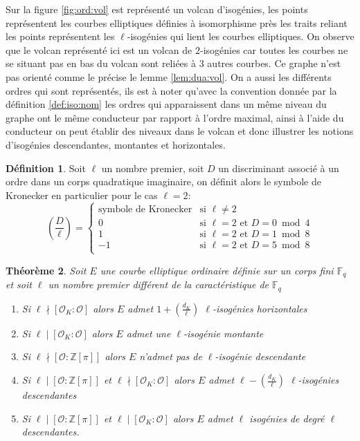 \documentclass[10pt,a4paper]{book}
\theoremstyle{plain}
\newtheorem{thm}{Théorème}[chapter]
\theoremstyle{definition}
\theoremstyle{definition}
\theoremstyle{definition}
\theoremstyle{definition}
\newtheorem{defi}[thm]{Définition}
\theoremstyle{remark}
\theoremstyle{remark}
\theoremstyle{definition}
\begin{document}
Sur la figure \ref{fig:ord:vol} est représenté un volcan d'isogénies, les points représentent les courbes elliptiques définies à isomorphisme près les traits reliant les points représentent les $\ell$-isogénies qui lient les courbes elliptiques. On observe que le volcan représenté ici est un volcan de $2$-isogénies car toutes les courbes ne se situant pas en bas du volcan sont reliées à $3$ autres courbes. Ce graphe n'est pas orienté comme le précise le lemme \ref{lem:dua:vol}. On a aussi les différents ordres qui sont représentés, ils est à noter qu'avec la convention donnée par la définition \ref{def:iso:nom} les ordres qui apparaissent dans un même niveau du graphe ont le même conducteur par rapport à l'ordre maximal, ainsi à l'aide du conducteur on peut établir des niveaux dans le volcan et donc illustrer les notions d'isogénies descendantes, montantes et horizontales. 

\begin{defi}
Soit $\ell$ un nombre premier, soit $D$ un discriminant associé à un ordre dans
un corps quadratique imaginaire, on définit alors le symbole de Kronecker en 
particulier pour le cas $\ell=2$:
\begin{equation*}
\left( \frac{D}{\ell} \right)= \begin{cases}
  \text{symbole de Kronecker} & \text{si } \ell\neq 2 \\
0 & \text{si } \ell=2 \text{ et } D=0 \bmod 4 \\
1 & \text{si } \ell=2 \text{ et } D=1 \bmod 8 \\
-1 & \text{si } \ell=2 \text{ et } D=5 \bmod 8 \\
\end{cases}
\end{equation*}
\end{defi}

\begin{thm}
\label{thm:Koh:cas}
Soit $E$ une courbe elliptique ordinaire définie sur un corps fini $\mathbb{F}_q$ et soit $\ell$ un nombre premier différent de la caractéristique de $\mathbb{F}_q$
\begin{enumerate}
\item Si $\ell \nmid [\mathcal{O}_K : \mathcal{O}]$ alors $E$ admet $ 1 + \left( \frac{d_K}{\ell} \right)$ $\ell$-isogénies horizontales
\item Si $\ell \mid [\mathcal{O}_K : \mathcal{O}]$ alors $E$ admet une $\ell$-isogénie montante
\item Si $\ell \nmid [\mathcal{O} : \mathbb{Z}[\pi]]$ alors $E$ n'admet pas de $\ell$-isogénie descendante
\item Si $\ell \mid [\mathcal{O} : \mathbb{Z}[\pi]]$ et $\ell \nmid [\mathcal{O}_K : \mathcal{O}]$ alors $E$ admet $\ell-\left( \frac{d_K}{\ell} \right)$ $\ell$-isogénies descendantes
\item  Si $\ell \mid [\mathcal{O} : \mathbb{Z}[\pi]]$ et $\ell \mid [\mathcal{O}_K : \mathcal{O}]$ alors $E$ admet $\ell$ isogénies de degré $\ell$ descendantes.
\end{enumerate}
\end{thm}
\end{document}

